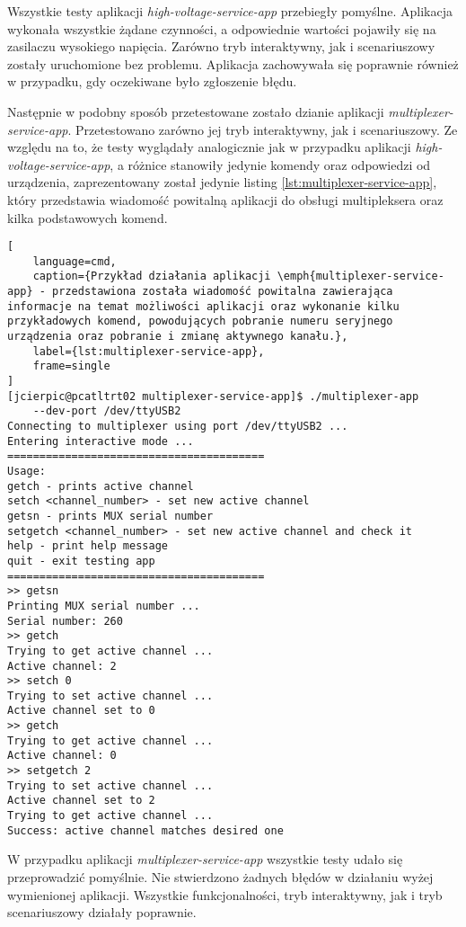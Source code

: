 Wszystkie testy aplikacji \emph{high-voltage-service-app} przebiegły pomyślne. Aplikacja wykonała wszystkie żądane czynności, a odpowiednie wartości pojawiły się na zasilaczu wysokiego napięcia. Zarówno tryb interaktywny, jak i scenariuszowy zostały uruchomione bez problemu. Aplikacja zachowywała się poprawnie również w przypadku, gdy oczekiwane było zgłoszenie błędu.

Następnie w podobny sposób przetestowane zostało dzianie aplikacji \emph{multiplexer-service-app}. Przetestowano zarówno jej tryb interaktywny, jak i scenariuszowy. Ze względu na to, że testy wyglądały analogicznie jak w przypadku aplikacji \emph{high-voltage-service-app}, a różnice stanowiły jedynie komendy oraz odpowiedzi od urządzenia, zaprezentowany został jedynie listing \ref{lst:multiplexer-service-app}, który przedstawia wiadomość powitalną aplikacji do obsługi multipleksera oraz kilka podstawowych komend.

\clearpage
\begin{lstlisting}[
    language=cmd,
    caption={Przykład działania aplikacji \emph{multiplexer-service-app} - przedstawiona została wiadomość powitalna zawierająca informacje na temat możliwości aplikacji oraz wykonanie kilku przykładowych komend, powodujących pobranie numeru seryjnego urządzenia oraz pobranie i zmianę aktywnego kanału.},
    label={lst:multiplexer-service-app},
    frame=single
]
[jcierpic@pcatltrt02 multiplexer-service-app]$ ./multiplexer-app 
    --dev-port /dev/ttyUSB2
Connecting to multiplexer using port /dev/ttyUSB2 ...
Entering interactive mode ...
========================================
Usage:
getch - prints active channel
setch <channel_number> - set new active channel
getsn - prints MUX serial number
setgetch <channel_number> - set new active channel and check it
help - print help message
quit - exit testing app
========================================
>> getsn
Printing MUX serial number ...
Serial number: 260
>> getch
Trying to get active channel ...
Active channel: 2
>> setch 0
Trying to set active channel ...
Active channel set to 0
>> getch
Trying to get active channel ...
Active channel: 0
>> setgetch 2
Trying to set active channel ...
Active channel set to 2
Trying to get active channel ...
Success: active channel matches desired one
\end{lstlisting}

W przypadku aplikacji \emph{multiplexer-service-app} wszystkie testy udało się przeprowadzić pomyślnie. Nie stwierdzono żadnych błędów w działaniu wyżej wymienionej aplikacji. Wszystkie funkcjonalności, tryb interaktywny, jak i tryb scenariuszowy działały poprawnie.

